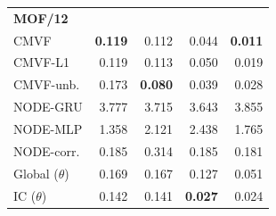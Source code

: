 \begin{tabular*}{\linewidth}{@{\extracolsep{\fill}}lrrrr}
\midrule
\multicolumn{5}{l}{\textbf{MOF/12}} \\
CMVF & \textbf{0.119} & 0.112 & 0.044 & \textbf{0.011} \\
CMVF-L1 & 0.119 & 0.113 & 0.050 & 0.019 \\
CMVF-unb. & 0.173 & \textbf{0.080} & 0.039 & 0.028 \\
NODE-GRU & 3.777 & 3.715 & 3.643 & 3.855 \\
NODE-MLP & 1.358 & 2.121 & 2.438 & 1.765 \\
NODE-corr. & 0.185 & 0.314 & 0.185 & 0.181 \\
Global ($\theta$) & 0.169 & 0.167 & 0.127 & 0.051 \\
IC ($\theta$) & 0.142 & 0.141 & \textbf{0.027} & 0.024 \\
\bottomrule
\end{tabular*}
